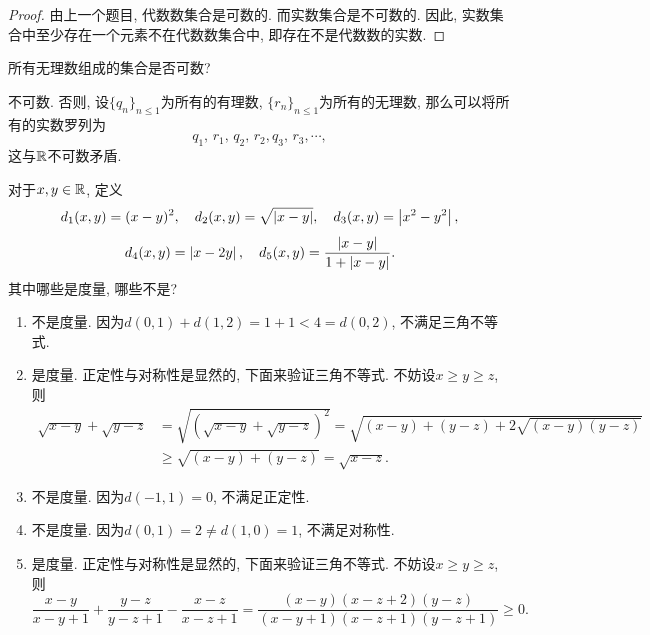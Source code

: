 \documentclass{article}
\begin{document}
\begin{proof}
    由上一个题目, 代数数集合是可数的. 而实数集合是不可数的. 因此, 实数集合中至少存在一个元素不在代数数集合中, 即存在不是代数数的实数.
\end{proof}

\begin{problem}[2-4]
    所有无理数组成的集合是否可数?
\end{problem}

\begin{solution}
    不可数. 否则, 设\( \{q_n\}_{n\le 1} \)为所有的有理数, \( \{r_n\}_{n\le 1 } \)为所有的无理数, 那么可以将所有的实数罗列为
    \[ q_1,\,r_1,\,q_2,\,r_2,q_3,\,r_3,\cdots, \] 
    这与\( \mathbb{R} \)不可数矛盾.
\end{solution}

\begin{problem}[2-11]
    对于\( x,y\in\mathbb{R}  \), 定义
    \[ d_1(x,y)=(x-y)^2,\quad d_2(x,y)=\sqrt{\left|x-y\right|},\quad d_3(x,y)=\left|x^2-y^2\right|, \] 
    \[ d_4(x,y)=\left|x-2y\right|,\quad d_5(x,y)=\frac{\left|x-y\right|}{1+\left|x-y\right|}. \]
    其中哪些是度量, 哪些不是? 
\end{problem}

\begin{solution}
    \begin{enumerate}[label=(\arabic*)]
        \item 不是度量. 因为\( d(0,1)+d(1,2)=1+1<4=d(0,2) \), 不满足三角不等式.
        \item 是度量. 正定性与对称性是显然的, 下面来验证三角不等式. 不妨设\( x\ge y\ge z \), 则
        \begin{align*}
            \sqrt{x-y}+\sqrt{y-z}&=\sqrt{\left(\sqrt{x-y}+\sqrt{y-z}\right)^2}=\sqrt{(x-y)+(y-z)+2\sqrt{(x-y)(y-z)}}\\
            &\ge \sqrt{(x-y)+(y-z)}=\sqrt{x-z}.
        \end{align*}
        \item 不是度量. 因为\( d(-1,1)=0 \), 不满足正定性.
        \item 不是度量. 因为\( d(0,1)=2\ne d(1,0)=1 \), 不满足对称性.
        \item 是度量. 正定性与对称性是显然的, 下面来验证三角不等式. 不妨设\( x\ge y\ge z \), 则
        \[ \frac{x-y}{x-y+1}+\frac{y-z}{y-z+1}-\frac{x-z}{x-z+1}=\frac{(x-y) (x-z+2) (y-z)}{(x-y+1) (x-z+1) (y-z+1)}\ge 0. \] 
    \end{enumerate}
\end{solution}
\end{document}
